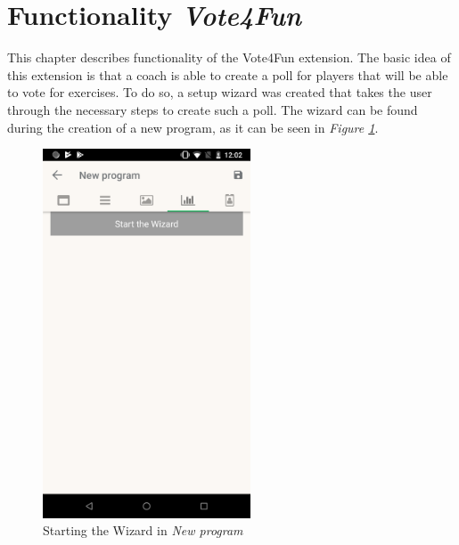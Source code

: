 \section{Functionality \textit{Vote4Fun}}
\label{sec:Vote4Fun}

This chapter describes functionality of the Vote4Fun extension. The basic idea of this extension is that a coach is able to create a poll for players that will be able to vote for exercises. To do so, a setup wizard was created that takes the user through the necessary steps to create such a poll. The wizard can be found during the creation of a new program, as it can be seen in \textit{Figure \ref{fig:select-wizard-screen}}.

\begin{figure}[H]
    \centering
    \includegraphics[width=0.55\textwidth,keepaspectratio]{content/pictures/screencap.png}
	\caption{Starting the Wizard in \textit{New program}}
	\label{fig:select-wizard-screen}
\end{figure}

